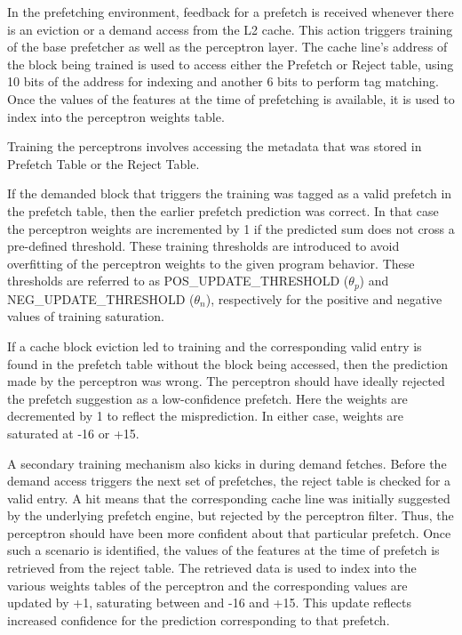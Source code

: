 In the prefetching environment, feedback for a prefetch is received whenever 
there is an eviction or a demand access from the L2 cache. This action 
triggers training of the base prefetcher as well as the perceptron layer.  
The cache line's address of the block being trained is used to access either the Prefetch
or Reject table, using 10 bits of the address for indexing and another 6 bits to 
perform tag matching.  Once the values of the features at the time of prefetching is available,
it is used to index into the perceptron weights table. \newline

\newline

Training the perceptrons involves accessing the metadata
that was stored in Prefetch Table or the Reject Table.  

If the demanded block that triggers the training was tagged as a valid
prefetch in the prefetch table, then the earlier prefetch prediction was
correct.  In that case the perceptron weights are incremented by 1 if the
predicted sum does not cross a pre-defined threshold. These training
thresholds are introduced to avoid overfitting of the perceptron weights to
the given program behavior. These thresholds are referred to as
POS\_UPDATE\_THRESHOLD ($\theta_p$) and \newline
NEG\_UPDATE\_THRESHOLD ($\theta_n$),
respectively for the positive and negative values of training saturation.

If a cache block eviction led to training and the corresponding valid entry is
found in the prefetch table without the block being accessed, then the
prediction made by the perceptron was wrong.  The perceptron should have
ideally rejected the prefetch suggestion as a low-confidence prefetch.  Here
the weights are decremented by 1 to reflect the misprediction. In either case,
weights are saturated at -16 or +15.

A secondary training mechanism also kicks in during demand fetches.  Before
the demand access triggers the next set of prefetches, the reject table is
checked for a valid entry.  A hit means that the corresponding cache line was
initially suggested by the underlying prefetch engine, but rejected by the
perceptron filter.  Thus, the perceptron should have been more confident about
that particular prefetch.  Once such a scenario is identified, the values of
the features at the time of prefetch is retrieved from the reject table.  The
retrieved data is used to index into the various weights tables of the
perceptron and the corresponding values are updated by +1, saturating between
and -16 and +15.  This update reflects increased confidence for the prediction
corresponding to that prefetch.

